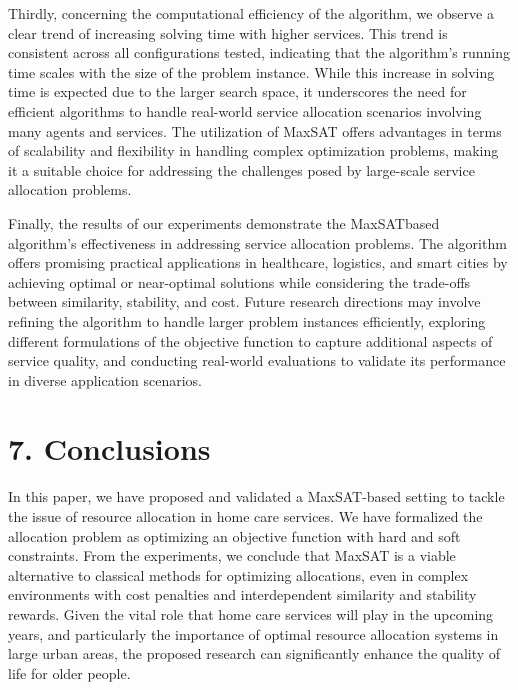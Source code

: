 \documentclass[10pt]{article}
\begin{document}
Thirdly, concerning the computational efficiency of the algorithm, we observe a clear trend of increasing solving time with higher services. This trend is consistent across all configurations tested, indicating that the algorithm's running time scales with the size of the problem instance. While this increase in solving time is expected due to the larger search space, it underscores the need for efficient algorithms to handle real-world service allocation scenarios involving many agents and services. The utilization of MaxSAT offers advantages in terms of scalability and flexibility in handling complex optimization problems, making it a suitable choice for addressing the challenges posed by large-scale service allocation problems.

Finally, the results of our experiments demonstrate the MaxSATbased algorithm's effectiveness in addressing service allocation problems. The algorithm offers promising practical applications in healthcare, logistics, and smart cities by achieving optimal or near-optimal solutions while considering the trade-offs between similarity, stability, and cost. Future research directions may involve refining the algorithm to handle larger problem instances efficiently, exploring different formulations of the objective function to capture additional aspects of service quality, and conducting real-world evaluations to validate its performance in diverse application scenarios.

\section*{7. Conclusions}
In this paper, we have proposed and validated a MaxSAT-based setting to tackle the issue of resource allocation in home care services. We have formalized the allocation problem as optimizing an objective function with hard and soft constraints. From the experiments, we conclude that MaxSAT is a viable alternative to classical methods for optimizing allocations, even in complex environments with cost penalties and interdependent similarity and stability rewards. Given the vital role that home care services will play in the upcoming years, and particularly the importance of optimal resource allocation systems in large urban areas, the proposed research can significantly enhance the quality of life for older people.
\end{document}

